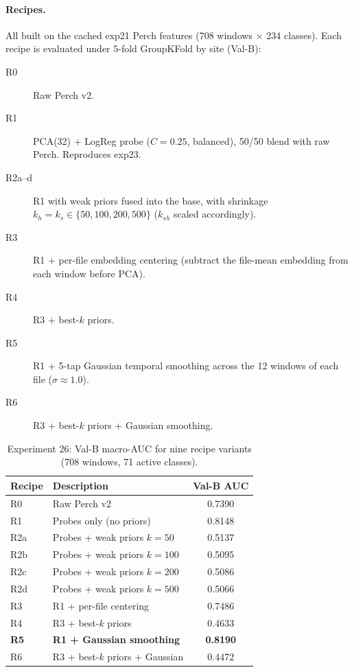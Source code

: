 \paragraph{Recipes.} All built on the cached exp21 Perch features
(708 windows $\times$ 234 classes). Each recipe is evaluated under
5-fold GroupKFold by site (Val-B):
\begin{description}
\item[R0] Raw Perch v2.
\item[R1] PCA(32) + LogReg probe ($C{=}0.25$, balanced),
50/50 blend with raw Perch. Reproduces exp23.
\item[R2a--d] R1 with weak priors fused into the base, with
shrinkage $k_h{=}k_s{\in}\{50, 100, 200, 500\}$
($k_{sh}$ scaled accordingly).
\item[R3] R1 + per-file embedding centering (subtract the
file-mean embedding from each window before PCA).
\item[R4] R3 + best-$k$ priors.
\item[R5] R1 + 5-tap Gaussian temporal smoothing across the
12 windows of each file ($\sigma{\approx}1.0$).
\item[R6] R3 + best-$k$ priors + Gaussian smoothing.
\end{description}

\begin{table}[h]
\centering
\caption{Experiment 26: Val-B macro-AUC for nine recipe variants
(708 windows, 71 active classes).}
\label{tab:exp26}
\begin{tabular}{llc}
\hline
\textbf{Recipe} & \textbf{Description} & \textbf{Val-B AUC} \\
\hline
R0  & Raw Perch v2                         & 0.7390 \\
R1  & Probes only (no priors)              & 0.8148 \\
R2a & Probes + weak priors $k{=}50$        & 0.5137 \\
R2b & Probes + weak priors $k{=}100$       & 0.5095 \\
R2c & Probes + weak priors $k{=}200$       & 0.5086 \\
R2d & Probes + weak priors $k{=}500$       & 0.5066 \\
R3  & R1 + per-file centering              & 0.7486 \\
R4  & R3 + best-$k$ priors                 & 0.4633 \\
\textbf{R5} & \textbf{R1 + Gaussian smoothing} & \textbf{0.8190} \\
R6  & R3 + best-$k$ priors + Gaussian      & 0.4472 \\
\hline
\end{tabular}
\end{table}


